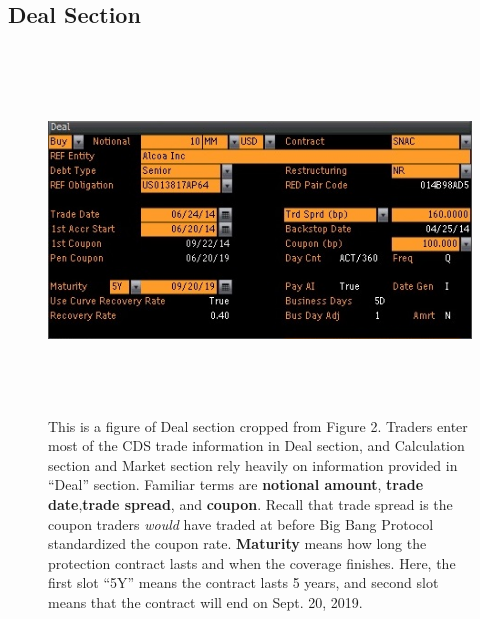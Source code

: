 \documentclass{jss}
\begin{document}
\subsection{Deal Section}

\begin{figure}[H]
\centering
\includegraphics[width=6.3in, height=3.8in]{images/AlcoaIncCDSDeal.jpg}
\caption{This is a figure of Deal section cropped from Figure 2. Traders enter most of the CDS trade information in Deal section, and Calculation section and Market section rely heavily on information provided in ``Deal'' section. Familiar terms are \textbf{notional amount}, \textbf{trade date},\textbf{trade spread}, and \textbf{coupon}. Recall that trade spread is the coupon traders \textit{would} have traded at before Big Bang Protocol standardized the coupon rate. \textbf{Maturity} means how long the protection contract lasts and when the coverage finishes. Here, the first slot ``5Y'' means the contract lasts 5 years, and second slot means that the contract will end on Sept. 20, 2019.}
\label{deal}
\end{figure}
\end{document}
